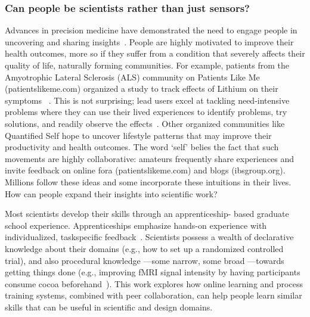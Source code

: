\subsubsection{Can people be scientists rather than just sensors?}
Advances in precision medicine have demonstrated the need
to engage people in uncovering and sharing insights~\cite{Aronson2015}. People
are highly motivated to improve their health outcomes,
more so if they suffer from a condition that severely affects
their quality of life, naturally forming communities. For example,
patients from the Amyotrophic Lateral Sclerosis
(ALS) community on Patients Like Me (patientslikeme.com)
organized a study to track effects of Lithium on their symptoms
~\cite{Wicks2011}. This is not surprising; lead users excel at tackling
need-intensive problems where they can use their lived
experiences to identify problems, try solutions, and readily
observe the effects~\cite{VonHippel2005}. Other organized communities like
Quantified Self hope to uncover lifestyle patterns that may
improve their productivity and health outcomes. The word
‘self’ belies the fact that such movements are highly collaborative:
amateurs frequently share experiences and invite
feedback on online fora (patientslikeme.com) and blogs
(ibsgroup.org). Millions follow these ideas and some incorporate
these intuitions in their lives. How can people expand
their insights into scientific work?

Most scientists develop their skills through an apprenticeship-
based graduate school experience. Apprenticeships emphasize
hands-on experience with individualized, taskspecific
feedback~\cite{schon1984reflective}. Scientists possess a wealth of declarative
knowledge about their domains (e.g., how to set up a
randomized controlled trial), and also procedural knowledge
—some narrow, some broad —towards getting things done
(e.g., improving fMRI signal intensity by having participants
consume cocoa beforehand~\cite{Francis2006}). This work explores how
online learning and process training systems, combined with
peer collaboration, can help people learn similar skills that
can be useful in scientific and design domains.

